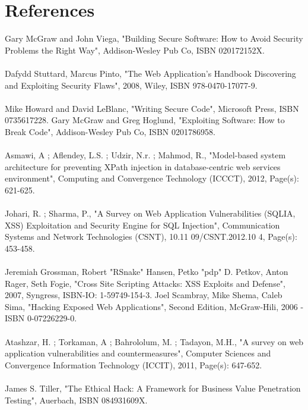 \documentclass[a4paper,12pt]{article}
\begin{document}
\section{References}
Gary McGraw and John Viega, "Building Secure Software: How to Avoid Security Problems the Right Way", Addison-Wesley Pub Co, ISBN 020172152X. \\
\\
Dafydd Stuttard, Marcus Pinto, "The Web Application's Handbook Discovering and Exploiting Security Flaws", 2008, Wiley, ISBN 978-0470-17077-9. \\
\\
Mike Howard and David LeBlanc, "Writing Secure Code", Microsoft Press, ISBN 0735617228.
Gary McGraw and Greg Hoglund, "Exploiting Software: How to Break Code", Addison-Wesley Pub Co, ISBN 0201786958. \\
\\
Asmawi, A ; Aflendey, L.S. ; Udzir, N.r. ; Mahmod, R., "Model-based system architecture for preventing XPath injection in database-centric web services environment", Computing and Convergence Technology (ICCCT), 2012, Page(s): 621-625. \\
\\
Johari, R. ; Sharma, P., "A Survey on Web Application Vulnerabilities (SQLIA, XSS) Exploitation and Security Engine for SQL Injection", Communication Systems and Network Technologies (CSNT), 10.11 09/CSNT.2012.10 4, Page(s): 453-458. \\
\\
Jeremiah Grossman, Robert "RSnake" Hansen, Petko "pdp" D. Petkov, Anton Rager, Seth Fogie, "Cross Site Scripting Attacks: XSS Exploits and Defense", 2007, Syngress, ISBN-IO: 1-59749-154-3. 
Joel Scambray, Mike Shema, Caleb Sima, "Hacking Exposed Web Applications", Second Edition, McGraw-Hili, 2006 - ISBN 0-07226229-0. \\
\\
Atashzar, H. ; Torkaman, A ; Bahrololum, M. ; Tadayon, M.H., "A survey on web application vulnerabilities and countermeasures", Computer Sciences and Convergence Information Technology (ICCIT), 2011, Page(s): 647-652. \\
\\
James S. Tiller, "The Ethical Hack: A Framework for Business Value Penetration Testing", Auerbach, ISBN 084931609X.\\
\end{document}
